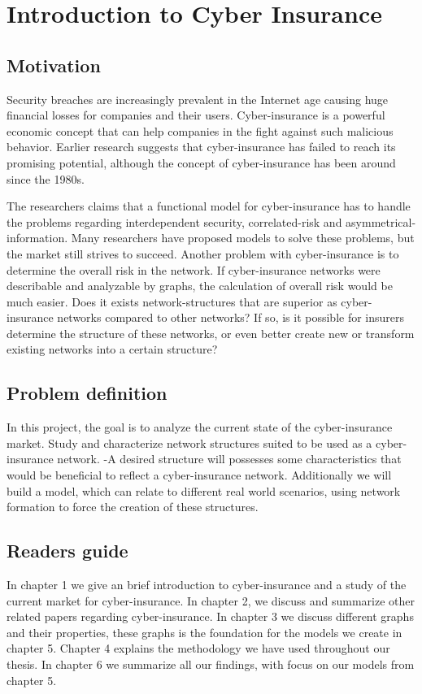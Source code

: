 \chapter{Introduction to Cyber Insurance}
\label{chp:introductionToCyberInsurance} 

\section{Motivation}
Security breaches are increasingly prevalent in the Internet age causing huge financial losses for companies and their users. Cyber-insurance is a powerful economic concept that can help companies in the fight against such malicious behavior. Earlier research suggests that cyber-insurance has failed to reach its promising potential, although the concept of cyber-insurance has been around since the 1980s. 

The researchers claims that a functional model for cyber-insurance has to handle the problems regarding interdependent security, correlated-risk and asymmetrical-information. Many researchers have proposed models to solve these problems, but the market still strives to succeed. Another problem with cyber-insurance is to determine the overall risk in the network. If cyber-insurance networks were describable and analyzable by graphs, the calculation of overall risk would be much easier. Does it exists network-structures that are superior as cyber-insurance networks compared to other networks? If so, is it possible for insurers determine the structure of these networks, or even better create new or transform existing networks into a certain structure?

\section{Problem definition}
In this project, the goal is to analyze the current state of the cyber-insurance market. Study and characterize network structures suited to be used as a cyber-insurance network. -A desired structure will possesses some characteristics that would be beneficial to reflect a cyber-insurance network. Additionally we will build a model, which can relate to different real world scenarios, using network formation to force the creation of these structures. 
\section{Readers guide}
In chapter 1 we give an brief introduction to cyber-insurance and a study of the current market for cyber-insurance. In chapter 2, we discuss and summarize other related papers regarding cyber-insurance. In chapter 3 we discuss different graphs and their properties, these graphs is the foundation for the models we create in chapter 5. Chapter 4 explains the methodology we have used throughout our thesis. In chapter 6 we summarize all our findings, with focus on our models from chapter 5. 

